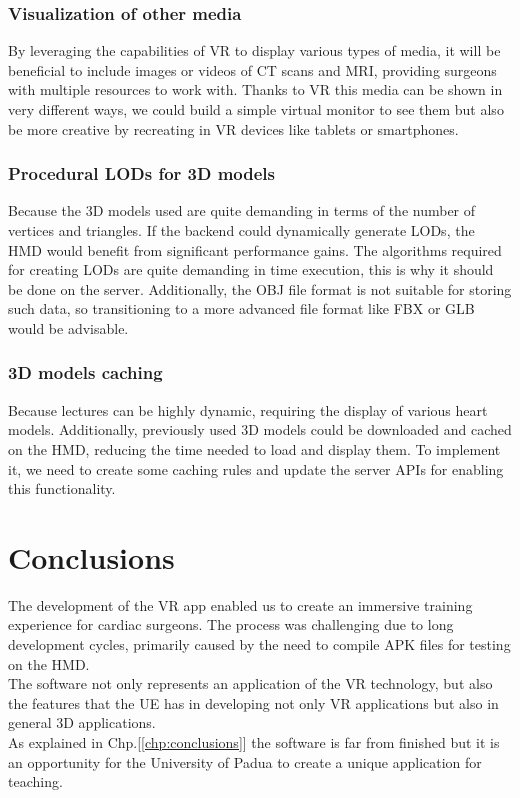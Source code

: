 \subsection{Visualization of other media}
\noindent
By leveraging the capabilities of \ac{VR} to display various types of media, it will be beneficial to include images or videos of \ac{CT} scans and \ac{MRI}, providing surgeons with multiple resources to work with.
Thanks to \ac{VR} this media can be shown in very different ways, we could build a simple virtual monitor to see them but also be more creative by recreating in \ac{VR} devices like tablets or smartphones.

\subsection{Procedural LODs for 3D models}
\noindent
Because the 3D models used are quite demanding in terms of the number of vertices and triangles. If the backend could dynamically generate \ac{LOD}s, the \ac{HMD} would benefit from significant performance gains.
The algorithms required for creating \ac{LOD}s are quite demanding in time execution, this is why it should be done on the server.
Additionally, the OBJ file format is not suitable for storing such data, so transitioning to a more advanced file format like FBX or GLB would be advisable.

\subsection{3D models caching}
\noindent
Because lectures can be highly dynamic, requiring the display of various heart models. Additionally, previously used 3D models could be downloaded and cached on the \ac{HMD}, reducing the time needed to load and display them.
To implement it, we need to create some caching rules and update the server \ac{API}s for enabling this functionality.

\chapter{Conclusions}
\noindent
The development of the \ac{VR} app enabled us to create an immersive training experience for cardiac surgeons.
The process was challenging due to long development cycles, primarily caused by the need to compile \ac{APK} files for testing on the \ac{HMD}.\\
The software not only represents an application of the \ac{VR} technology, but also the features  that the \ac{UE} has in developing not only \ac{VR} applications but also in general 3D applications.\\
As explained in Chp.[\ref{chp:conclusions}] the software is far from finished but it is an opportunity for the University of Padua to create a unique application for teaching.\\